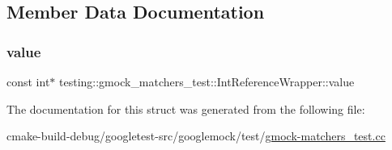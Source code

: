 \subsection{Member Data Documentation}
\mbox{\label{structtesting_1_1gmock__matchers__test_1_1IntReferenceWrapper_ac8fcb05733aa1fdb6c5236731b236cf6}} 
\subsubsection{\texorpdfstring{value}{value}}
{\footnotesize\ttfamily const int$\ast$ testing\+::gmock\+\_\+matchers\+\_\+test\+::\+Int\+Reference\+Wrapper\+::value}



The documentation for this struct was generated from the following file\+:\begin{DoxyCompactItemize}
\item 
cmake-\/build-\/debug/googletest-\/src/googlemock/test/\mbox{\hyperlink{gmock-matchers__test_8cc}{gmock-\/matchers\+\_\+test.\+cc}}\end{DoxyCompactItemize}
